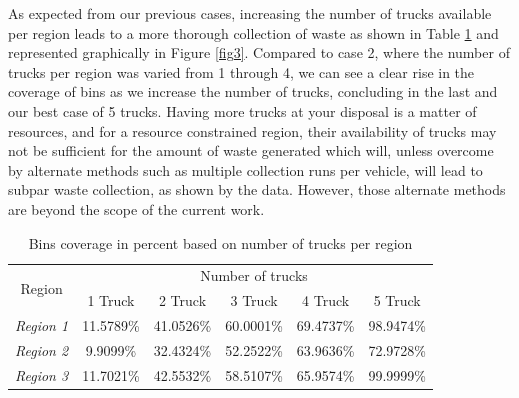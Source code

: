 \documentclass[12pt]{article}
\begin{document}
As expected from our previous cases, increasing the number of trucks available per region leads to a more thorough collection of waste as shown in Table \ref{tab4} and represented graphically in Figure \ref{fig3}. Compared to case 2, where the number of trucks per region was varied from 1 through 4, we can see a clear rise in the coverage of bins as we increase the number of trucks, concluding in the last and our best case of 5 trucks. Having more trucks at your disposal is a matter of resources, and for a resource constrained region, their availability of trucks may not be sufficient for the amount of waste generated which will, unless overcome by alternate methods such as multiple collection runs per vehicle, will lead to subpar waste collection, as shown by the data. However, those alternate methods are beyond the scope of the current work.
\begin{table}[H]
    \centering
    \caption{ Bins coverage in percent based on number of trucks per region} \label{tab4}
    \vspace*{0.3cm}
    \begin{tabular}{|c|c|c|c|c|c|}
        \hline \multirow{2}{*}{Region} & \multicolumn{5}{c|}{Number of trucks}\\
        \cline{2-6}& 1 Truck& 2 Truck& 3 Truck& 4 Truck& 5 Truck\\
        \hline \textit{Region 1} & 11.5789\%& 41.0526\%& 60.0001\%& 69.4737\%& 98.9474\%\\
        \hline \textit{Region 2} &9.9099\%&32.4324\%&52.2522\%&63.9636\%&72.9728\%\\
        \hline \textit{Region 3} &11.7021\%&42.5532\%&58.5107\%&65.9574\%&99.9999\%\\
        \hline
    \end{tabular}
\end{table}
\end{document}
